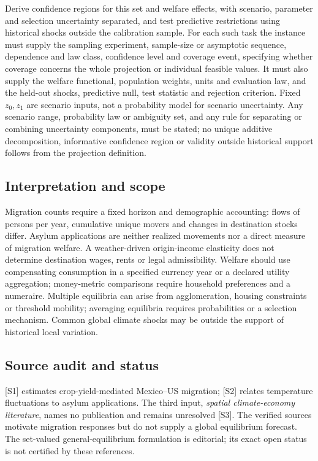 \documentclass[11pt,a4paper]{article}
\begin{document}
Derive confidence regions for this set and welfare effects, with scenario, parameter and selection uncertainty separated, and test predictive restrictions using historical shocks outside the calibration sample. For each such task the instance must supply the sampling experiment, sample-size or asymptotic sequence, dependence and law class, confidence level and coverage event, specifying whether coverage concerns the whole projection or individual feasible values. It must also supply the welfare functional, population weights, units and evaluation law, and the held-out shocks, predictive null, test statistic and rejection criterion. Fixed $z_0,z_1$ are scenario inputs, not a probability model for scenario uncertainty. Any scenario range, probability law or ambiguity set, and any rule for separating or combining uncertainty components, must be stated; no unique additive decomposition, informative confidence region or validity outside historical support follows from the projection definition.

\subsection*{Interpretation and scope}

Migration counts require a fixed horizon and demographic accounting: flows of persons per year, cumulative unique movers and changes in destination stocks differ. Asylum applications are neither realized movements nor a direct measure of migration welfare. A weather-driven origin-income elasticity does not determine destination wages, rents or legal admissibility. Welfare should use compensating consumption in a specified currency year or a declared utility aggregation; money-metric comparisons require household preferences and a numeraire. Multiple equilibria can arise from agglomeration, housing constraints or threshold mobility; averaging equilibria requires probabilities or a selection mechanism. Common global climate shocks may be outside the support of historical local variation.

\subsection*{Source audit and status}

[S1] estimates crop-yield-mediated Mexico--US migration; [S2] relates temperature fluctuations to asylum applications. The third input, \emph{spatial climate-economy literature}, names no publication and remains unresolved [S3]. The verified sources motivate migration responses but do not supply a global equilibrium forecast. The set-valued general-equilibrium formulation is editorial; its exact open status is not certified by these references.
\end{document}

